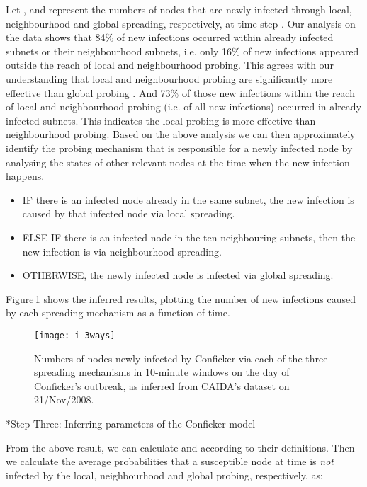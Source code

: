 \documentclass[9pt]{article}
\makeatletter
\newcommand{\reffig}[1]{Figure\,\ref{#1}}
\renewcommand{\subsection}{\@startsection {subsection}{2}{0pt}{-6pt}{1pt}{\reset@font \normalsize \bfseries}}
\makeatother
\begin{document}
{Let ,  and  represent the numbers of nodes that are newly infected through local, neighbourhood and global spreading, respectively, at time step . 
Our analysis on the data shows that 84\% of new infections occurred within already infected subnets or their neighbourhood subnets, i.e. only 16\% of new infections appeared outside the reach of local and neighbourhood probing. This agrees with our understanding that local and neighbourhood probing are significantly more effective than global probing \cite{Shin_2012}. And 73\% of those new infections within the reach of local and neighbourhood probing (i.e.  of all new infections) occurred in already infected subnets. This indicates the local probing is more effective than neighbourhood probing. Based on the above analysis we can then approximately identify the probing mechanism that is responsible for a newly infected node by analysing the states of other relevant nodes at the time when the new infection happens.
\begin{itemize}
\item IF there is an infected node already in the same subnet, the new infection is caused by that infected node via local spreading.
\item ELSE IF there is an infected node in the ten neighbouring subnets, then the new infection is via neighbourhood spreading.
\item OTHERWISE, the newly infected node is infected via global spreading.
\end{itemize}
\reffig{fig-newly-infected} shows the inferred results, plotting the number of new infections caused by each spreading mechanism as a function of time.

\begin{figure}[h]
\small\centering
\texttt{[image: i-3ways]}
\caption{\label{fig-newly-infected}Numbers of nodes newly infected by Conficker via each of the three spreading mechanisms in  10-minute windows on the day of Conficker's outbreak, as inferred from CAIDA's dataset on 21/Nov/2008.}
\end{figure}





\subsection*{Step Three: Inferring parameters of the Conficker model}\label{sec-method}

From the above result, we can calculate  and  according to their definitions. 
Then we calculate the average probabilities that a susceptible node at time  is \textit{not} infected by the local, neighbourhood and global probing, respectively,  as: 

}
\end{document}

